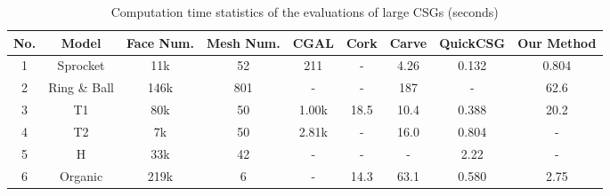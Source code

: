 \begin{table*}[ht]
\caption{Computation time statistics of the evaluations of large CSGs (seconds)}
\label{tab:performance2}
\centering
\begin{tabular}{*{8}{c|}c}%
\hline
{No.} & {Model} & {Face Num.} & {Mesh Num.} &
CGAL  & Cork & Carve & QuickCSG & Our Method
\\
\hline\hline
1 & Sprocket & 11k & 52 & 211  & - & 4.26 & 0.132 & 0.804\\
2 & Ring \& Ball & 146k & 801 & -  & - & 187 & - & 62.6\\
3 & T1 & 80k & 50 & 1.00k & 18.5 & 10.4 & 0.388 & 20.2\\
4 & T2 & 7k & 50 & 2.81k & - & 16.0 & 0.804 & -\\
5 & H & 33k & 42 & - & - & - & 2.22 & -\\
6 & Organic & 219k & 6 & - & 14.3 & 63.1 & 0.580 & 2.75\\
\hline
\end{tabular}
\begin{flushleft}
\end{flushleft}
\end{table*}



